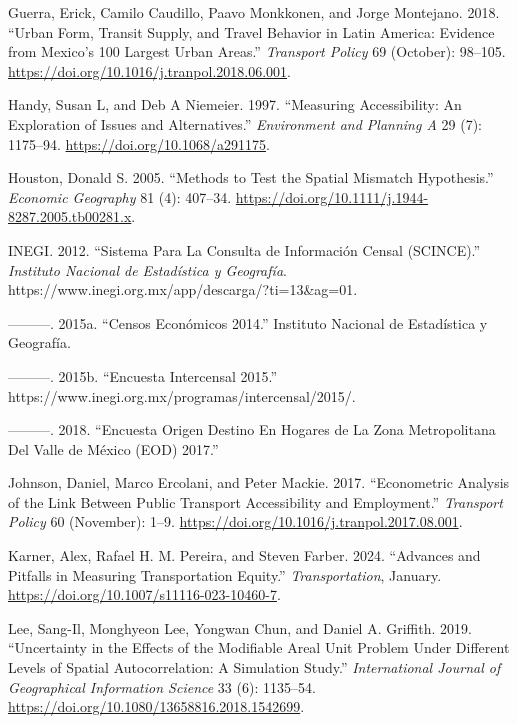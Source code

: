 \documentclass{article}
\newlength{\cslhangindent}
\newenvironment{CSLReferences}[2] %
 {\begin{list}{}{%
  \setlength{\itemindent}{0pt}
  \setlength{\leftmargin}{0pt}
  \setlength{\parsep}{0pt}
  \ifodd #1
   \setlength{\leftmargin}{\cslhangindent}
   \setlength{\itemindent}{-1\cslhangindent}
  \fi
  \setlength{\itemsep}{#2\baselineskip}}}
 {\end{list}}
\begin{document}
\begin{CSLReferences}{1}{0}
Guerra, Erick, Camilo Caudillo, Paavo Monkkonen, and Jorge Montejano.
2018. {``Urban Form, Transit Supply, and Travel Behavior in {Latin
America}: {Evidence} from {Mexico}'s 100 Largest Urban Areas.''}
\emph{Transport Policy} 69 (October): 98--105.
\url{https://doi.org/10.1016/j.tranpol.2018.06.001}.

Handy, Susan L, and Deb A Niemeier. 1997. {``Measuring Accessibility: An
Exploration of Issues and Alternatives.''} \emph{Environment and
Planning A} 29 (7): 1175--94. \url{https://doi.org/10.1068/a291175}.

Houston, Donald S. 2005. {``Methods to {Test} the {Spatial Mismatch
Hypothesis}.''} \emph{Economic Geography} 81 (4): 407--34.
\url{https://doi.org/10.1111/j.1944-8287.2005.tb00281.x}.

INEGI. 2012. {``Sistema Para La {Consulta} de {Informaci{ó}n Censal}
({SCINCE}).''} \emph{Instituto Nacional de Estad{í}stica y Geograf{í}a}.
https://www.inegi.org.mx/app/descarga/?ti=13\&ag=01.

---------. 2015a. {``Censos {Econ{ó}micos} 2014.''} Instituto Nacional
de Estad{í}stica y Geograf{í}a.

---------. 2015b. {``Encuesta {Intercensal} 2015.''}
https://www.inegi.org.mx/programas/intercensal/2015/.

---------. 2018. {``Encuesta {Origen Destino} En {Hogares} de La {Zona
Metropolitana} Del {Valle} de {M{é}xico} ({EOD}) 2017.''}

Johnson, Daniel, Marco Ercolani, and Peter Mackie. 2017. {``Econometric
Analysis of the Link Between Public Transport Accessibility and
Employment.''} \emph{Transport Policy} 60 (November): 1--9.
\url{https://doi.org/10.1016/j.tranpol.2017.08.001}.

Karner, Alex, Rafael H. M. Pereira, and Steven Farber. 2024. {``Advances
and Pitfalls in Measuring Transportation Equity.''}
\emph{Transportation}, January.
\url{https://doi.org/10.1007/s11116-023-10460-7}.

Lee, Sang-Il, Monghyeon Lee, Yongwan Chun, and Daniel A. Griffith. 2019.
{``Uncertainty in the Effects of the Modifiable Areal Unit Problem Under
Different Levels of Spatial Autocorrelation: A Simulation Study.''}
\emph{International Journal of Geographical Information Science} 33 (6):
1135--54. \url{https://doi.org/10.1080/13658816.2018.1542699}.


\end{CSLReferences}
\end{document}
